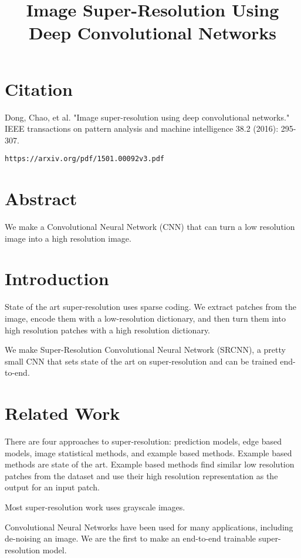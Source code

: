 \documentclass[a4paper]{article}
\title{Image Super-Resolution Using Deep Convolutional Networks}
\date{}
\begin{document}
\maketitle

\section{Citation}
Dong, Chao, et al. "Image super-resolution using deep convolutional networks." IEEE transactions on pattern analysis and machine intelligence 38.2 (2016): 295-307.

\begin{verbatim}
https://arxiv.org/pdf/1501.00092v3.pdf
\end{verbatim}

\section{Abstract}
We make a Convolutional Neural Network (CNN) that can turn a low resolution
image into a high resolution image.

\section{Introduction}
State of the art super-resolution uses sparse coding. We extract patches from
the image, encode them with a low-resolution dictionary, and then turn them
into high resolution patches with a high resolution dictionary.

We make Super-Resolution Convolutional Neural Network (SRCNN), a pretty small
CNN that sets state of the art on super-resolution and can be trained
end-to-end.

\section{Related Work}
There are four approaches to super-resolution: prediction models, edge based
models, image statistical methods, and example based methods. Example based
methods are state of the art. Example based methods find similar low resolution
patches from the dataset and use their high resolution representation as
the output for an input patch.

Most super-resolution work uses grayscale images.

Convolutional Neural Networks have been used for many applications, including
de-noising an image. We are the first to make an end-to-end trainable
super-resolution model.
\end{document}
